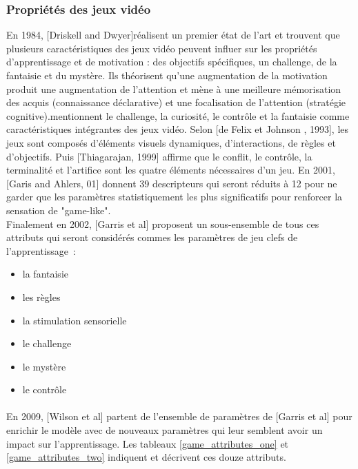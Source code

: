 		\subsubsection*{Propriétés des jeux vidéo}
En 1984, [Driskell and Dwyer]\cite{Dris84}réalisent un premier état de l'art et trouvent que plusieurs caractéristiques des jeux vidéo peuvent influer sur les propriétés d'apprentissage et de motivation : des objectifs spécifiques, un challenge, de la fantaisie et du mystère. Ils théorisent qu'une augmentation de la motivation produit une augmentation de l'attention et mène à une meilleure mémorisation des acquis (connaissance déclarative) et une focalisation de l'attention (stratégie cognitive). mentionnent le challenge, la curiosité, le contrôle et la fantaisie comme caractéristiques intégrantes des jeux vidéo. Selon [de Felix et Johnson , 1993], les jeux sont composés d'éléments visuels dynamiques, d'interactions, de règles et d'objectifs. Puis [Thiagarajan, 1999] affirme que le conflit, le contrôle, la terminalité et l'artifice sont les quatre éléments nécessaires d'un jeu. En 2001, [Garis and Ahlers, 01] donnent 39 descripteurs qui seront réduits à 12 pour ne garder que les paramètres statistiquement les plus significatifs pour renforcer la sensation de "game-like". \\ Finalement en 2002, [Garris et al] proposent un sous-ensemble de tous ces attributs qui seront considérés commes les paramètres de jeu clefs de l'apprentissage~:
\begin{itemize}
	\item la fantaisie
	\item les règles
	\item la stimulation sensorielle
	\item le challenge
	\item le mystère
	\item le contrôle
\end{itemize}

\paragraph{}En 2009, [Wilson et al]\cite{Wils09} partent de l'ensemble de paramètres de [Garris et al] pour enrichir le modèle avec de nouveaux paramètres qui leur semblent avoir un impact sur l'apprentissage.
Les tableaux \ref{game_attributes_one} et \ref{game_attributes_two} indiquent et décrivent ces douze attributs.

